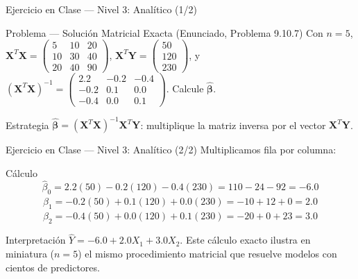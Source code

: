 \documentclass[10pt, aspectratio=169]{beamer}
\begin{document}
\begin{frame}{Ejercicio en Clase --- Nivel 3: Analítico (1/2)}
  \footnotesize
  \begin{block}{Problema --- Solución Matricial Exacta (Enunciado, Problema 9.10.7)}
    Con $n=5$, $\mathbf{X}^T\mathbf{X}=\begin{pmatrix}5&10&20\\10&30&40\\20&40&90\end{pmatrix}$, $\mathbf{X}^T\mathbf{Y}=\begin{pmatrix}50\\120\\230\end{pmatrix}$, y $(\mathbf{X}^T\mathbf{X})^{-1}=\begin{pmatrix}2.2&-0.2&-0.4\\-0.2&0.1&0.0\\-0.4&0.0&0.1\end{pmatrix}$. Calcule $\hat{\boldsymbol\beta}$.
  \end{block}

  \vspace{0.1cm}
  \pause
  \begin{alertblock}{Estrategia}
    \scriptsize
    $\hat{\boldsymbol\beta}=(\mathbf{X}^T\mathbf{X})^{-1}\mathbf{X}^T\mathbf{Y}$: multiplique la matriz inversa por el vector $\mathbf{X}^T\mathbf{Y}$.
  \end{alertblock}
\end{frame}

\begin{frame}{Ejercicio en Clase --- Nivel 3: Analítico (2/2)}
  \scriptsize
  Multiplicamos fila por columna: \pause

  \vspace{0.05cm}
  \begin{block}{Cálculo}
    \scriptsize
    $$\hat\beta_0=2.2(50)-0.2(120)-0.4(230)=110-24-92=-6.0$$
    $$\hat\beta_1=-0.2(50)+0.1(120)+0.0(230)=-10+12+0=2.0$$
    $$\hat\beta_2=-0.4(50)+0.0(120)+0.1(230)=-20+0+23=3.0$$
  \end{block}

  \vspace{0.05cm}
  \pause
  \begin{alertblock}{Interpretación}
    $\hat Y=-6.0+2.0X_1+3.0X_2$. Este cálculo exacto ilustra en miniatura ($n=5$) el mismo procedimiento matricial que resuelve modelos con cientos de predictores.
  \end{alertblock}
\end{frame}
\end{document}
